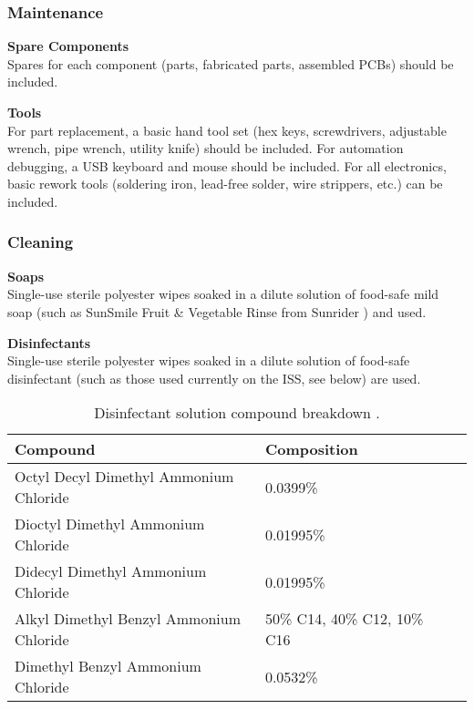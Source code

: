 \subsubsection{Maintenance}

\textbf{Spare Components}\\
Spares for each component (parts, fabricated parts, assembled PCBs) should be included.

\textbf{Tools}\\
For part replacement, a basic hand tool set (hex keys, screwdrivers, adjustable wrench, pipe wrench, utility knife) should be included. For automation debugging, a USB keyboard and mouse should be included. For all electronics, basic rework tools (soldering iron, lead-free solder, wire strippers, etc.) can be included.

\subsubsection{Cleaning}

\textbf{Soaps}\\
Single-use sterile polyester wipes soaked in a dilute solution of food-safe mild soap (such as SunSmile Fruit \& Vegetable Rinse from Sunrider \cite{soap})  and used.

\textbf{Disinfectants}\\
Single-use sterile polyester wipes soaked in a dilute solution of food-safe disinfectant (such as those used currently on the ISS, see below) are used.

\begin{table}[!ht]
    \centering
    \begin{tabular}{|l|l|l|c|}
    \hline
        Compound                                & Composition                   \\ \hline
        Octyl Decyl Dimethyl Ammonium Chloride  & 0.0399\%                      \\ \hline
        Dioctyl Dimethyl Ammonium Chloride      & 0.01995\%                     \\ \hline
        Didecyl Dimethyl Ammonium Chloride      & 0.01995\%                     \\ \hline
        Alkyl Dimethyl Benzyl Ammonium Chloride & 50\% C14, 40\% C12, 10\% C16  \\ \hline
        Dimethyl Benzyl Ammonium Chloride       & 0.0532\%                      \\ \hline
    \end{tabular}
    \caption{Disinfectant solution compound breakdown \cite{disinfectant}.}
    \label{tab:cleaning_disinfectant}
\end{table}